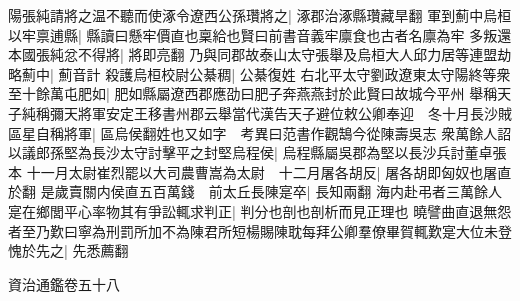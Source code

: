 陽張純請將之温不聽而使涿令遼西公孫瓚將之|{
	涿郡治涿縣瓚藏旱翻}
軍到薊中烏桓以牢禀逋縣|{
	縣讀曰懸牢價直也稟給也賢曰前書音義牢廪食也古者名廪為牢}
多叛還本國張純忿不得將|{
	將即亮翻}
乃與同郡故泰山太守張舉及烏桓大人邱力居等連盟劫略薊中|{
	薊音計}
殺護烏桓校尉公綦稠|{
	公綦復姓}
右北平太守劉政遼東太守陽終等衆至十餘萬屯肥如|{
	肥如縣屬遼西郡應劭曰肥子奔燕燕封於此賢曰故城今平州}
舉稱天子純稱彌天將軍安定王移書州郡云舉當代漢告天子避位敕公卿奉迎　冬十月長沙賊區星自稱將軍|{
	區烏侯翻姓也又如字　考異曰范書作觀鵠今從陳壽吳志}
衆萬餘人詔以議郎孫堅為長沙太守討擊平之封堅烏程侯|{
	烏程縣屬吳郡為堅以長沙兵討董卓張本}
十一月太尉崔烈罷以大司農曹嵩為太尉　十二月屠各胡反|{
	屠各胡即匈奴也屠直於翻}
是歲賣關内侯直五百萬錢　前太丘長陳寔卒|{
	長知兩翻}
海内赴弔者三萬餘人寔在鄉閭平心率物其有爭訟輒求判正|{
	判分也剖也剖析而見正理也}
曉譬曲直退無怨者至乃歎曰寧為刑罰所加不為陳君所短楊賜陳耽每拜公卿羣僚畢賀輒歎寔大位未登愧於先之|{
	先悉薦翻}


資治通鑑卷五十八
